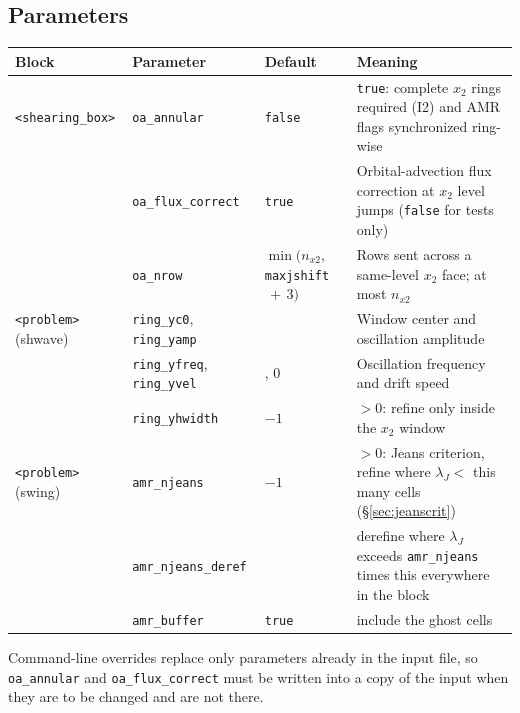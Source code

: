 \documentclass[11pt]{article}
\newcommand{\code}[1]{\texttt{#1}}
\begin{document}
\subsection{Parameters}
\begin{center}
\small
\begin{tabular}{@{}>{\raggedright\arraybackslash}p{2.6cm}>{\raggedright\arraybackslash}p{3.4cm}>{\raggedright\arraybackslash}p{2.6cm}p{5.4cm}@{}}
\toprule
Block & Parameter & Default & Meaning \\
\midrule
\code{<shearing\_box>} & \code{oa\_annular} & \code{false} & \code{true}: complete $x_2$
  rings required (I2) and AMR flags synchronized ring-wise \\
 & \code{oa\_flux\_correct} & \code{true} & Orbital-advection flux correction at $x_2$
  level jumps (\code{false} for tests only) \\
 & \code{oa\_nrow} & $\min(n_{x2},$ \code{maxjshift}$\,{+}\,3)$ & Rows sent across a same-level
  $x_2$ face; at most $n_{x2}$ \\
\midrule
\code{<problem>} (shwave) & \code{ring\_yc0}, \code{ring\_yamp} & 0 & Window center and
  oscillation amplitude \\
 & \code{ring\_yfreq}, \code{ring\_yvel} & 1, 0 & Oscillation frequency and drift speed \\
 & \code{ring\_yhwidth} & $-1$ & $> 0$: refine only inside the $x_2$ window \\
\code{<problem>} (swing) & \code{amr\_njeans} & $-1$ & $> 0$: Jeans criterion,
  refine where $\lambda_J <$ this many cells (\S\ref{sec:jeanscrit}) \\
 & \code{amr\_njeans\_deref} & 2.5 & derefine where $\lambda_J$ exceeds
  \code{amr\_njeans} times this everywhere in the block \\
 & \code{amr\_buffer} & \code{true} & include the ghost cells \\
\bottomrule
\end{tabular}
\end{center}
\noindent
Command-line overrides replace only parameters already in the input file, so
\code{oa\_annular} and \code{oa\_flux\_correct} must be written into a copy of the input
when they are to be changed and are not there.
\end{document}
